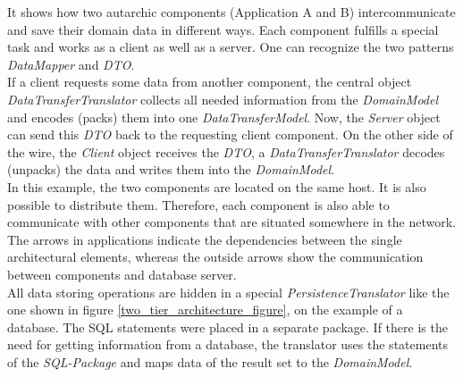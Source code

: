 It shows how two autarchic components (Application A and B) intercommunicate
and save their domain data in different ways. Each component fulfills a special
task and works as a client as well as a server. One can recognize the two patterns
\emph{DataMapper} and \emph{DTO}.\\
If a client requests some data from another component, the central object
\emph{DataTransferTranslator} collects all needed information from the \emph{DomainModel}
and encodes (packs) them into one \emph{DataTransferModel}. Now, the \emph{Server}
object can send this \emph{DTO} back to the requesting client component. On the
other side of the wire, the \emph{Client} object receives the \emph{DTO}, a
\emph{DataTransferTranslator} decodes (unpacks) the data and writes them into the
\emph{DomainModel}.\\
In this example, the two components are located on the same host. It is also
possible to distribute them. Therefore, each component is also able to communicate
with other components that are situated somewhere in the network. The arrows in
applications indicate the dependencies between the single architectural elements,
whereas the outside arrows show the communication between components and database
server.\\
All data storing operations are hidden in a special \emph{PersistenceTranslator}
like the one shown in figure \ref{two_tier_architecture_figure}, on the example
of a database. The SQL statements were placed in a separate package. If there is
the need for getting information from a database, the translator uses the statements
of the \emph{SQL-Package} and maps data of the result set to the \emph{DomainModel}.
